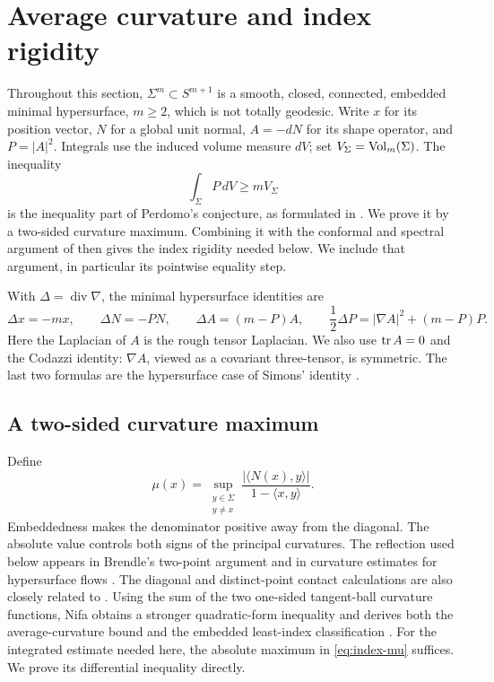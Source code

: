 \section{Average curvature and index rigidity}\label{sec:index}

Throughout this section, $\Sigma^m\subset S^{m+1}$ is a smooth, closed,
connected, embedded minimal hypersurface, $m\ge2$, which is not totally
geodesic.  Write $x$ for its position vector, $N$ for a global unit normal,
$A=-dN$ for its shape operator, and $P=|A|^2$.  Integrals use the induced
volume measure $dV$; set $V_\Sigma=\operatorname{Vol}_m(\Sigma)$.  The inequality
\[
  \int_\Sigma P\,dV\ge mV_\Sigma
\]
is the inequality part of Perdomo's conjecture, as formulated in
\cite[Conjecture~1.5]{GeLi2021}.  We prove it by a two-sided curvature
maximum.  Combining it with the conformal and spectral argument of
\cite[Theorem~3.1]{Perdomo2004} then gives the index rigidity needed below.
We include that argument, in particular its pointwise equality step.

With $\Delta=\operatorname{div}\nabla$, the minimal hypersurface identities
are
\begin{equation}\label{eq:index-geometric-identities}
 \Delta x=-mx,\qquad \Delta N=-PN,\qquad
 \Delta A=(m-P)A,\qquad
 \frac12\Delta P=|\nabla A|^2+(m-P)P.
\end{equation}
Here the Laplacian of $A$ is the rough tensor Laplacian.  We also use
$\operatorname{tr} A=0$ and the Codazzi identity: $\nabla A$, viewed as a covariant
three-tensor, is symmetric.  The last two formulas are the hypersurface
case of Simons' identity
\cite[Theorem~5.3.1, equation~(5.3.2)]{Simons1968}.

\subsection{A two-sided curvature maximum}

Define
\begin{equation}\label{eq:index-mu}
 \mu(x)=\sup_{\substack{y\in\Sigma\\y\ne x}}
 \frac{|\langle N(x),y\rangle|}{1-\langle x,y\rangle}.
\end{equation}
Embeddedness makes the denominator positive away from the diagonal.
The absolute value controls both signs of the principal curvatures.
The reflection used below appears in Brendle's two-point argument
\cite[Section~2]{Brendle2013} and in curvature estimates for hypersurface
flows \cite[Section~2]{AHLW2015}. The diagonal and distinct-point contact
calculations are also closely related to
\cite[Lemma~3.5 and Proposition~4.1]{Nifa2026}.
Using the sum of the two one-sided tangent-ball curvature functions,
Nifa obtains a stronger quadratic-form inequality and derives both the
average-curvature bound and the embedded least-index classification
\cite[Theorem~1.1 and Corollary~7.3]{Nifa2026}.
For the integrated estimate needed here, the absolute maximum in
\eqref{eq:index-mu} suffices. We prove its differential inequality directly.

